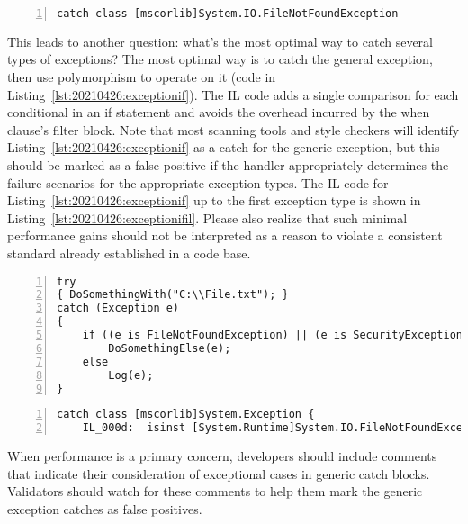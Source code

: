 \begin{lstlisting}[caption={Classically-Conditioned Exception IL},captionpos=b,style=CSharpStyle,numbers=left,stepnumber=1,label={lst:20210426:exception2il}]
catch class [mscorlib]System.IO.FileNotFoundException
\end{lstlisting}

This leads to another question: what's the most optimal way to catch several types of exceptions? The most optimal way is to catch the general exception, then use polymorphism to operate on it (code in Listing~\ref{lst:20210426:exceptionif}). The IL code adds a single comparison for each conditional in an if statement and avoids the overhead incurred by the when clause's filter block. Note that most scanning tools and style checkers will identify Listing~\ref{lst:20210426:exceptionif} as a catch for the generic exception, but this should be marked as a false positive if the handler appropriately determines the failure scenarios for the appropriate exception types. The IL code for Listing~\ref{lst:20210426:exceptionif} up to the first exception type is shown in Listing~\ref{lst:20210426:exceptionifil}. Please also realize that such minimal performance gains should not be interpreted as a reason to violate a consistent standard already established in a code base.

\begin{lstlisting}[caption={If-Formatted Exception Chain},captionpos=b,style=CSharpStyle,numbers=left,stepnumber=1,label={lst:20210426:exceptionif}]
try
{ DoSomethingWith("C:\\File.txt"); }
catch (Exception e)
{
	if ((e is FileNotFoundException) || (e is SecurityException))
		DoSomethingElse(e);
	else
		Log(e);
}
\end{lstlisting}

\begin{lstlisting}[caption={If-Formatted Exception Chain IL},captionpos=b,style=CSharpStyle,numbers=left,stepnumber=1,label={lst:20210426:exceptionifil}]
catch class [mscorlib]System.Exception {
	IL_000d:  isinst [System.Runtime]System.IO.FileNotFoundException
\end{lstlisting}

When performance is a primary concern, developers should include comments that indicate their consideration of exceptional cases in generic catch blocks. Validators should watch for these comments to help them mark the generic exception catches as false positives.
